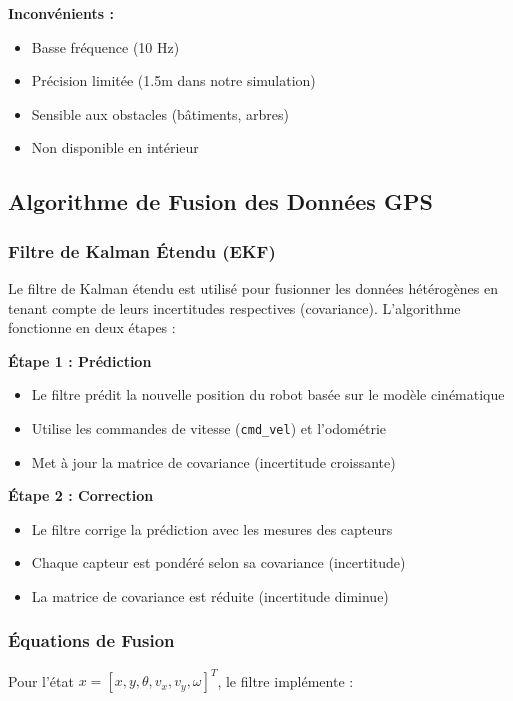 \documentclass[a4paper,12pt]{article}
\begin{document}
\textbf{Inconvénients :}
\begin{itemize}
    \item Basse fréquence (10 Hz)
    \item Précision limitée (1.5m dans notre simulation)
    \item Sensible aux obstacles (bâtiments, arbres)
    \item Non disponible en intérieur
\end{itemize}

\subsection{Algorithme de Fusion des Données GPS}

\subsubsection{Filtre de Kalman Étendu (EKF)}

Le filtre de Kalman étendu est utilisé pour fusionner les données hétérogènes en tenant compte de leurs incertitudes respectives (covariance). L'algorithme fonctionne en deux étapes :

\textbf{Étape 1 : Prédiction}
\begin{itemize}
    \item Le filtre prédit la nouvelle position du robot basée sur le modèle cinématique
    \item Utilise les commandes de vitesse (\texttt{cmd\_vel}) et l'odométrie
    \item Met à jour la matrice de covariance (incertitude croissante)
\end{itemize}

\textbf{Étape 2 : Correction}
\begin{itemize}
    \item Le filtre corrige la prédiction avec les mesures des capteurs
    \item Chaque capteur est pondéré selon sa covariance (incertitude)
    \item La matrice de covariance est réduite (incertitude diminue)
\end{itemize}

\subsubsection{Équations de Fusion}

Pour l'état $x = [x, y, \theta, v_x, v_y, \omega]^T$, le filtre implémente :
\end{document}
